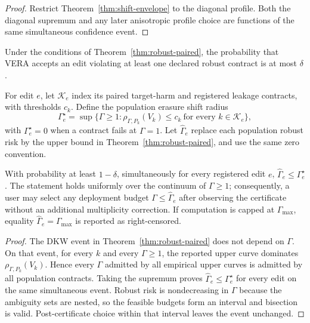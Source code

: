 \begin{proof}
Restrict Theorem~\ref{thm:shift-envelope} to the diagonal profile. Both the
diagonal supremum and any later anisotropic profile choice are functions of the
same simultaneous confidence event.
\end{proof}

\begin{corollary}
Under the conditions of Theorem~\ref{thm:robust-paired}, the probability that
VERA accepts an edit violating at least one declared robust contract is at most
$\delta$.
\end{corollary}

For edit $e$, let $\mathcal{K}_e$ index its paired target-harm and registered
leakage contracts, with thresholds $c_k$. Define the population erasure shift
radius
\begin{equation}
 \Gamma_e^\star=\sup\{\Gamma\geq1:
 \rho_{\Gamma,P_k}(V_k)\leq c_k\ \text{for every }k\in\mathcal{K}_e\},
\end{equation}
with $\Gamma_e^\star=0$ when a contract fails at $\Gamma=1$. Let
$\widehat\Gamma_e$ replace each population robust risk by the upper bound in
Theorem~\ref{thm:robust-paired}, and use the same zero convention.

\begin{theorem}
\label{thm:shift-radius}
With probability at least $1-\delta$, simultaneously for every registered edit
$e$, $\widehat\Gamma_e\leq\Gamma_e^\star$. The statement holds uniformly over
the continuum of $\Gamma\geq1$; consequently, a user may select any deployment
budget $\Gamma\leq\widehat\Gamma_e$ after observing the certificate without an
additional multiplicity correction. If computation is capped at
$\Gamma_{\max}$, equality $\widehat\Gamma_e=\Gamma_{\max}$ is reported as
right-censored.
\end{theorem}

\begin{proof}
The DKW event in Theorem~\ref{thm:robust-paired} does not depend on $\Gamma$.
On that event, for every $k$ and every $\Gamma\geq1$, the reported upper curve
dominates $\rho_{\Gamma,P_k}(V_k)$. Hence every $\Gamma$ admitted by all
empirical upper curves is admitted by all population contracts. Taking the
supremum proves $\widehat\Gamma_e\leq\Gamma_e^\star$ for every edit on the same
simultaneous event. Robust risk is nondecreasing in $\Gamma$ because the
ambiguity sets are nested, so the feasible budgets form an interval and
bisection is valid. Post-certificate choice within that interval leaves the
event unchanged.
\end{proof}

